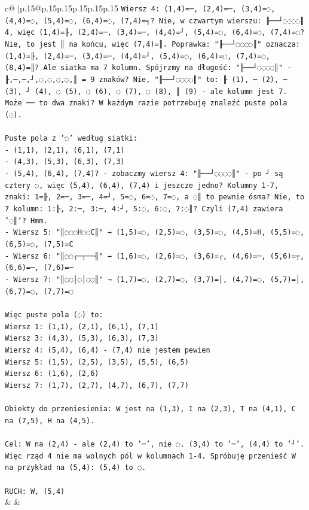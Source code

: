 \documentclass{article}
\begin{document}
{\begin{supertabular}{c@{$\;$}|p{.15\linewidth}@{}p{.15\linewidth}p{.15\linewidth}p{.15\linewidth}p{.15\linewidth}p{.15\linewidth}}
{{{\texttt{Wiersz 4: (1,4)=─, (2,4)=─, (3,4)=◌, (4,4)=◌, (5,4)=◌, (6,4)=◌, (7,4)=╕? Nie, w czwartym wierszu: ╟──┘◌◌◌◌║ 4, więc (1,4)=╟, (2,4)=─, (3,4)=─, (4,4)=┘, (5,4)=◌, (6,4)=◌, (7,4)=◌? Nie, to jest ║ na końcu, więc (7,4)=║. Poprawka: "╟──┘◌◌◌◌║" oznacza: (1,4)=╟, (2,4)=─, (3,4)=─, (4,4)=┘, (5,4)=◌, (6,4)=◌, (7,4)=◌, (8,4)=║? Ale siatka ma 7 kolumn. Spójrzmy na długość: "╟──┘◌◌◌◌║" {-} ╟,─,─,┘,◌,◌,◌,◌,║ = 9 znaków? Nie, "╟──┘◌◌◌◌║" to: ╟ (1), ─ (2), ─ (3), ┘ (4), ◌ (5), ◌ (6), ◌ (7), ◌ (8), ║ (9) {-} ale kolumn jest 7. Może ── to dwa znaki? W każdym razie potrzebuję znaleźć puste pola (◌).} \\
\\ 
\texttt{Puste pola z '◌' według siatki:} \\
\texttt{{-} (1,1), (2,1), (6,1), (7,1)} \\
\texttt{{-} (4,3), (5,3), (6,3), (7,3)} \\
\texttt{{-} (5,4), (6,4), (7,4)? {-} zobaczmy wiersz 4: "╟──┘◌◌◌◌║" {-} po ┘ są cztery ◌, więc (5,4), (6,4), (7,4) i jeszcze jedno? Kolumny 1{-}7, znaki: 1=╟, 2=─, 3=─, 4=┘, 5=◌, 6=◌, 7=◌, a ◌║ to pewnie ósma? Nie, to 7 kolumn: 1:╟, 2:─, 3:─, 4:┘, 5:◌, 6:◌, 7:◌║? Czyli (7,4) zawiera '◌║'? Hmm.} \\
\texttt{{-} Wiersz 5: "║◌◌◌H◌◌C║" → (1,5)=◌, (2,5)=◌, (3,5)=◌, (4,5)=H, (5,5)=◌, (6,5)=◌, (7,5)=C} \\
\texttt{{-} Wiersz 6: "║◌◌┌─┬──╢" → (1,6)=◌, (2,6)=◌, (3,6)=┌, (4,6)=─, (5,6)=┬, (6,6)=─, (7,6)=─} \\
\texttt{{-} Wiersz 7: "║◌◌│◌│◌◌║" → (1,7)=◌, (2,7)=◌, (3,7)=│, (4,7)=◌, (5,7)=│, (6,7)=◌, (7,7)=◌} \\
\\ 
\texttt{Więc puste pola (◌) to:} \\
\texttt{Wiersz 1: (1,1), (2,1), (6,1), (7,1)} \\
\texttt{Wiersz 3: (4,3), (5,3), (6,3), (7,3)} \\
\texttt{Wiersz 4: (5,4), (6,4) {-} (7,4) nie jestem pewien} \\
\texttt{Wiersz 5: (1,5), (2,5), (3,5), (5,5), (6,5)} \\
\texttt{Wiersz 6: (1,6), (2,6)} \\
\texttt{Wiersz 7: (1,7), (2,7), (4,7), (6,7), (7,7)} \\
\\ 
\texttt{Obiekty do przeniesienia: W jest na (1,3), I na (2,3), T na (4,1), C na (7,5), H na (4,5).} \\
\\ 
\texttt{Cel: W na (2,4) {-} ale (2,4) to '─', nie ◌. (3,4) to '─', (4,4) to '┘'. Więc rząd 4 nie ma wolnych pól w kolumnach 1{-}4. Spróbuję przenieść W na przykład na (5,4): (5,4) to ◌.} \\
\\ 
\texttt{RUCH: W, (5,4)} \\
            }
        }
    }
    & & \\ \\


\end{supertabular}}
\end{document}
